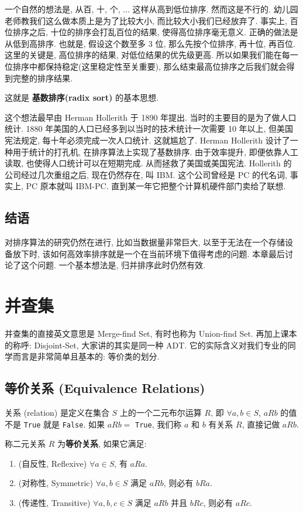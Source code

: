\documentclass[a4paper]{ctexart}
\newcommand{\hl}[1]
{\noindent {\bf {#1}}}
\theoremstyle{definition}
\theoremstyle{definition}
\begin{document}
一个自然的想法是, 从百, 十, 个, ... 这样从高到低位排序. 然而这是不行的.
幼儿园老师教我们这么做本质上是为了比较大小, 而比较大小我们已经放弃了.
事实上, 百位排序之后, 十位的排序会打乱百位的结果, 使得高位排序毫无意义.
正确的做法是从低到高排序. 也就是, 假设这个数至多 3 位, 那么先按个位排序,
再十位, 再百位. 这里的关键是, 高位排序的结果, 对低位结果的优先级更高.
所以如果我们能在每一位排序中都保持稳定(这里稳定性至关重要),
那么结束最高位排序之后我们就会得到完整的排序结果.


这就是 {\bf 基数排序(radix sort)} 的基本思想.

这个想法最早由 Herman Hollerith 于 1890 年提出.
当时的主要目的是为了做人口统计.
1880 年美国的人口已经多到以当时的技术统计一次需要 10 年以上, 但美国宪法规定,
每十年必须完成一次人口统计. 这就尴尬了. Herman Hollerith 设计了一种用于统计的打孔机,
在排序算法上实现了基数排序. 由于效率提升, 即便依靠人工读取, 也使得人口统计可以在短期完成.
从而拯救了美国或美国宪法. Hollerith 的公司经过几次重组之后, 现在仍然存在,
叫 IBM. 这个公司曾经是 PC 的代名词, 事实上, PC 原本就叫 IBM-PC.
直到某一年它把整个计算机硬件部门卖给了联想. 

\subsection{结语}
对排序算法的研究仍然在进行, 比如当数据量非常巨大, 以至于无法在一个存储设备放下时,
该如何高效率排序就是一个在当前环境下值得考虑的问题. 本章最后讨论了这个问题.
一个基本想法是, 归并排序此时仍然有效.

\section{并查集}

并查集的直接英文意思是 Merge-find Set, 有时也称为 Union-find Set. 
再加上课本的称呼: Disjoint-Set, 大家讲的其实是同一种 ADT. 
它的实际含义对我们专业的同学而言是非常简单且基本的: 等价类的划分. 

\subsection{等价关系 (Equivalence Relations)}
关系 (relation) 是定义在集合 $S$ 上的一个二元布尔运算 $R$, 
即 $\forall a, b \in S$, $a R b$ 的值不是 \verb|True| 就是 \verb|False|. 
如果 $a R b =$ \verb|True|, 我们称 $a$ 和 $b$ 有关系 $R$, 直接记做 $aRb$.

\hl{定义} 称二元关系 $R$ 为{\bfseries 等价关系}, 如果它满足:
\begin{enumerate}
  \item (自反性, Reﬂexive) $\forall a \in S$, 有 $aRa$.
  \item (对称性, Symmetric) $\forall a, b \in S$ 满足 $aRb$, 则必有 $bRa$.
  \item (传递性, Transitive) $\forall a, b, c \in S$ 满足 $aRb$ 并且 $bRc$, 则必有 $aRc$.
\end{enumerate}
\end{document}
